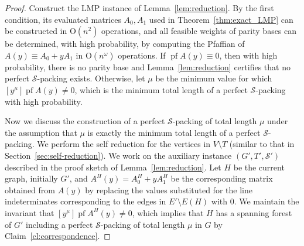 \documentclass[11pt, a4paper]{article}
\theoremstyle{plain}
\theoremstyle{definition}
\theoremstyle{remark}
\newcommand{\cS}{\mathcal{S}}
\DeclareMathOperator{\pf}{pf}
\begin{document}
\begin{proof}
Construct the LMP instance of Lemma~\ref{lem:reduction}.
By the first condition, its evaluated matrices $A_0, A_1$ used in Theorem~\ref{thm:exact_LMP} can be constructed in $\mathrm{O}(n^2)$ operations, and all feasible weights of parity bases can be determined, with high probability, by computing the Pfaffian of $A(y) \equiv A_0 + yA_1$ in $\mathrm{O}(n^\omega)$ operations.
If $\pf A(y) \equiv 0$, then with high probability, there is no parity base and Lemma~\ref{lem:reduction} certifies that no perfect $\cS$-packing exists.
Otherwise, let $\mu$ be the minimum value for which $[y^\mu] \pf A(y) \neq 0$, which is the minimum total length of a perfect $\cS$-packing with high probability.

Now we discuss the construction of a perfect $\cS$-packing of total length $\mu$ under the assumption that $\mu$ is exactly the minimum total length of a perfect $\cS$-packing.
We perform the self reduction for the vertices in $V \setminus T$ (similar to that in Section~\ref{sec:self-reduction}).
We work on the auxiliary instance $(G', T', \cS')$ described in the proof sketch of Lemma~\ref{lem:reduction}.
Let $H$ be the current graph, initially $G'$, and $A^{H}(y) = A^H_0 + yA^H_1$ be the corresponding matrix obtained from $A(y)$ by replacing the values substituted for the line indeterminates corresponding to the edges in $E' \setminus E(H)$ with $0$.
We maintain the invariant that $[y^\mu]\pf A^H(y) \neq 0$, which implies that $H$ has a spanning forest of $G'$ including a perfect $\cS$-packing of total length $\mu$ in $G$ by Claim~\ref{cl:correspondence}.


\end{proof}
\end{document}
